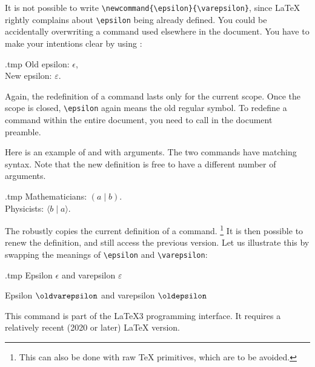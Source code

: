 It is not possible to write \verb|\newcommand{\epsilon}{\varepsilon}|,
since \LaTeX{} rightly complains about \verb|\epsilon| being already defined.
You could be accidentally overwriting a command used elsewhere in the document.
You have to make your intentions clear by using :

\begin{VerbatimOut}{\jobname.tmp}
Old epsilon: $\epsilon$,\\
\renewcommand{\epsilon}{\varepsilon}
New epsilon: $\epsilon$.
\end{VerbatimOut}
\ShowExample
%
Again, the redefinition of a command lasts only for the current scope.
Once the scope is closed, \verb|\epsilon| again means the old regular symbol.
To redefine a command within the entire document,
you need to call  in the document preamble.

Here is an example of  and  with arguments.
The two commands have matching syntax.
Note that the new definition is free to have a different number of arguments.

\begin{VerbatimOut}{\jobname.tmp}
\newcommand{\dual}[2]{(#1 \mid #2)}
Mathematicians: $\dual{a}{b}$.\\
\renewcommand{\dual}[2]
  {\langle#2 \mid #1\rangle}
Physicists: $\dual{a}{b}$.
\end{VerbatimOut}
\ShowExample

The  robustly copies the current definition of a command.%
\footnote{This can also be done with raw \TeX{} primitives, which are to be avoided.}
It is then possible to renew the definition, and still access the previous version.
Let us illustrate this by swapping the meanings of \verb|\epsilon| and \verb|\varepsilon|:
%
\begin{VerbatimOut}{\jobname.tmp}
Epsilon $\epsilon$ and varepsilon $\varepsilon$

\DeclareCommandCopy{\oldepsilon}{\epsilon}
\DeclareCommandCopy
    {\oldvarepsilon}{\varepsilon}
\renewcommand{\epsilon}{\oldvarepsilon}
\renewcommand{\varepsilon}{\oldepsilon}

Epsilon $\epsilon$ and varepsilon $\varepsilon$
\end{VerbatimOut}
\ShowExample

\begin{latexthree}
This command is part of the \LaTeX3 programming interface.
It requires a relatively recent (2020 or later) \LaTeX{} version.
\end{latexthree}



